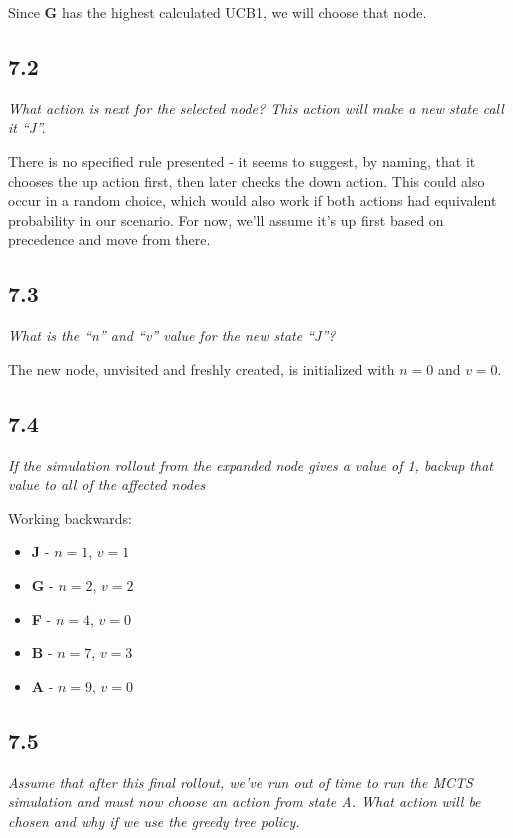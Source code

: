 \documentclass{article}
\begin{document}
Since \textbf{G} has the highest calculated UCB1, we will choose that node.

\subsection*{7.2}

\textit{What action is next for the selected node? This action will make a new state call it “J”.}

There is no specified rule presented - it seems to suggest, by naming, that it chooses the up action first, then later checks the down action. This could also occur in a random choice, which would also work if both actions had equivalent probability in our scenario. For now, we'll assume it's up first based on precedence and move from there.

\subsection*{7.3}

\textit{What is the “n” and “v” value for the new state “J”?}

The new node, unvisited and freshly created, is initialized with $n=0$ and $v=0$.

\subsection*{7.4}

\textit{If the simulation rollout from the expanded node gives a value of 1, backup that value to all of the affected nodes}

Working backwards:

\begin{itemize}
    \item \textbf{J} - $n=1$, $v=1$
    \item \textbf{G} - $n=2$, $v=2$
    \item \textbf{F} - $n=4$, $v=0$
    \item \textbf{B} - $n=7$, $v=3$
    \item \textbf{A} - $n=9$, $v=0$
\end{itemize}

\subsection*{7.5}

\textit{Assume that after this final rollout, we've run out of time to run the MCTS simulation and must now choose an action from state A. What action will be chosen and why if we use the greedy tree policy.}
\end{document}

